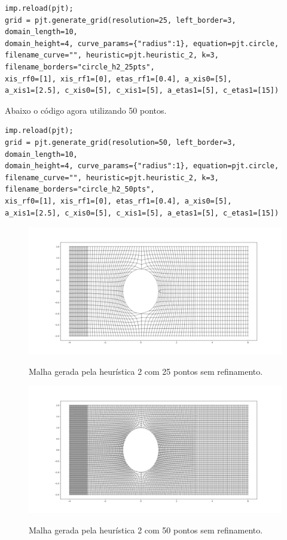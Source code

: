 \documentclass[a4paper]{article}
\begin{document}
\begin{verbatim}
imp.reload(pjt);  
grid = pjt.generate_grid(resolution=25, left_border=3, domain_length=10, 
domain_height=4, curve_params={"radius":1}, equation=pjt.circle, 
filename_curve="", heuristic=pjt.heuristic_2, k=3, filename_borders="circle_h2_25pts", 
xis_rf0=[1], xis_rf1=[0], etas_rf1=[0.4], a_xis0=[5], 
a_xis1=[2.5], c_xis0=[5], c_xis1=[5], a_etas1=[5], c_etas1=[15])
\end{verbatim}

Abaixo o código agora utilizando 50 pontos.
\begin{verbatim}
imp.reload(pjt);  
grid = pjt.generate_grid(resolution=50, left_border=3, domain_length=10, 
domain_height=4, curve_params={"radius":1}, equation=pjt.circle, 
filename_curve="", heuristic=pjt.heuristic_2, k=3, filename_borders="circle_h2_50pts", 
xis_rf0=[1], xis_rf1=[0], etas_rf1=[0.4], a_xis0=[5], 
a_xis1=[2.5], c_xis0=[5], c_xis1=[5], a_etas1=[5], c_etas1=[15])
\end{verbatim}


\begin{figure}[H]
	\centering
	\includegraphics[width=1.0\textwidth]{heuristica_2_25pts.png}
	\label{fig:heuristic2_50pts} 
	\caption[caption]{Malha gerada pela heurística 2 com 25 pontos sem refinamento.}
\end{figure}

\begin{figure}[H]
	\centering
	\includegraphics[width=1.0\textwidth]{heuristica_2_50pts.png}
	\label{fig:heuristic2_100pts} 
	\caption[caption]{Malha gerada pela heurística 2 com 50 pontos sem refinamento.}
\end{figure}
\end{document}
